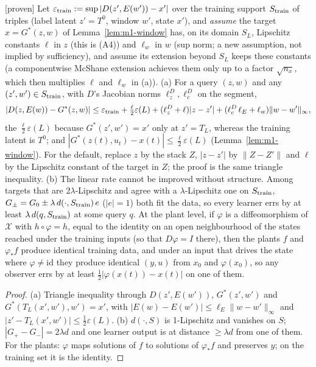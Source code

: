 \begin{corollary}\label{cor:m1-ood}
[proven] Let $\varepsilon_{\rm train}:=\sup|D(z',E(w'))-x'|$ over the training support $S_{\rm train}$ of triples
(label latent $z'=T^0$, window $w'$, state $x'$), and \emph{assume} the target $x=G^*(z,w)$ of Lemma~\ref{lem:m1-window}
has, on its domain $S_L$, Lipschitz constants $\ell$ in $z$ (this is (A4)) and $\ell_w$ in $w$ (sup norm; a new assumption,
not implied by sufficiency), and assume its extension beyond $S_L$ keeps these constants (a componentwise McShane
extension achieves them only up to a factor $\sqrt{n_x}$, which then multiplies $\ell$ and $\ell_w$ in (a)).
(a) For a query $(z,w)$ and any $(z',w')\in S_{\rm train}$, with $D$'s Jacobian norms $\ell^D_z,\ell^D_c$ on the segment,
\[
|D(z,E(w))-G^*(z,w)|\le\varepsilon_{\rm train}+\tfrac{\ell}{2}\varepsilon(L)+(\ell^D_z+\ell)|z-z'|+(\ell^D_c\,\ell_E+\ell_w)\|w-w'\|_\infty ,
\]
the $\tfrac{\ell}{2}\varepsilon(L)$ because $G^*(z',w')=x'$ only at $z'=T_L$, whereas the training latent is $T^0$; and
$|G^*(z(t),u_t)-x(t)|\le\tfrac{\ell}{2}\varepsilon(L)$ (Lemma~\ref{lem:m1-window}).
 For the default, replace $z$ by the stack $Z$, $|z-z'|$ by $\|Z-Z'\|$ and $\ell$ by the Lipschitz constant of
the target in $Z$; the proof is the same triangle inequality.
(b) The linear rate cannot be improved without structure. Among targets that are $2\lambda$-Lipschitz and agree with a
$\lambda$-Lipschitz one on $S_{\rm train}$, $G_\pm=G_0\pm\lambda\,d(\cdot,S_{\rm train})\,e$ ($|e|=1$) both fit the data,
so every learner errs by at least $\lambda\,d(q,S_{\rm train})$ at some query $q$. At the plant level, if $\varphi$ is a
diffeomorphism of $\mathcal X$ with $h\circ\varphi=h$, equal to the identity on an open neighbourhood of the states reached
under the training inputs (so that $D\varphi=I$ there), then the plants $f$ and $\varphi_*f$ produce identical training
data, and under an input that drives the state where $\varphi\neq\mathrm{id}$ they produce identical $(y,u)$ from $x_0$ and
$\varphi(x_0)$, so any observer errs by at least $\tfrac12|\varphi(x(t))-x(t)|$ on one of them.
\end{corollary}
\begin{proof}
(a) Triangle inequality through $D(z',E(w'))$, $G^*(z',w')$ and $G^*(T_L(x',w'),w')=x'$, with
$|E(w)-E(w')|\le\ell_E\|w-w'\|_\infty$ and $|z'-T_L(x',w')|\le\tfrac12\varepsilon(L)$.
(b) $d(\cdot,S)$ is 1-Lipschitz and vanishes on $S$; $|G_+-G_-|=2\lambda d$ and one learner output is at distance
$\ge\lambda d$ from one of them. For the plants: $\varphi$ maps solutions of $f$ to solutions of $\varphi_*f$ and preserves
$y$; on the training set it is the identity.
\end{proof}
